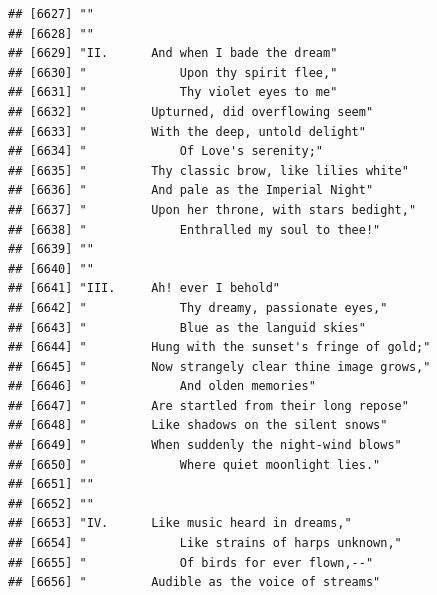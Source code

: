 \documentclass{article}\usepackage[]{graphicx}\usepackage[]{color}
\makeatletter
\newenvironment{kframe}{%
 \def\at@end@of@kframe{}%
 \ifinner\ifhmode%
  \def\at@end@of@kframe{\end{minipage}}%
  \begin{minipage}{\columnwidth}%
 \fi\fi%
 \def\FrameCommand##1{\hskip\@totalleftmargin \hskip-\fboxsep
 \colorbox{shadecolor}{##1}\hskip-\fboxsep
     \hskip-\linewidth \hskip-\@totalleftmargin \hskip\columnwidth}%
 \MakeFramed {\advance\hsize-\width
   \@totalleftmargin\z@ \linewidth\hsize
   \@setminipage}}%
 {\par\unskip\endMakeFramed%
 \at@end@of@kframe}
\newenvironment{knitrout}{}{} %
\makeatother
\begin{document}
\begin{knitrout}
\begin{kframe}
\begin{verbatim}
## [6627] ""                                                                            
## [6628] ""                                                                            
## [6629] "II.      And when I bade the dream"                                          
## [6630] "             Upon thy spirit flee,"                                          
## [6631] "             Thy violet eyes to me"                                          
## [6632] "         Upturned, did overflowing seem"                                     
## [6633] "         With the deep, untold delight"                                      
## [6634] "             Of Love's serenity;"                                            
## [6635] "         Thy classic brow, like lilies white"                                
## [6636] "         And pale as the Imperial Night"                                     
## [6637] "         Upon her throne, with stars bedight,"                               
## [6638] "             Enthralled my soul to thee!"                                    
## [6639] ""                                                                            
## [6640] ""                                                                            
## [6641] "III.     Ah! ever I behold"                                                  
## [6642] "             Thy dreamy, passionate eyes,"                                   
## [6643] "             Blue as the languid skies"                                      
## [6644] "         Hung with the sunset's fringe of gold;"                             
## [6645] "         Now strangely clear thine image grows,"                             
## [6646] "             And olden memories"                                             
## [6647] "         Are startled from their long repose"                                
## [6648] "         Like shadows on the silent snows"                                   
## [6649] "         When suddenly the night-wind blows"                                 
## [6650] "             Where quiet moonlight lies."                                    
## [6651] ""                                                                            
## [6652] ""                                                                            
## [6653] "IV.      Like music heard in dreams,"                                        
## [6654] "             Like strains of harps unknown,"                                 
## [6655] "             Of birds for ever flown,--"                                     
## [6656] "         Audible as the voice of streams"                                    

\end{verbatim}
\end{kframe}
\end{knitrout}
\end{document}
